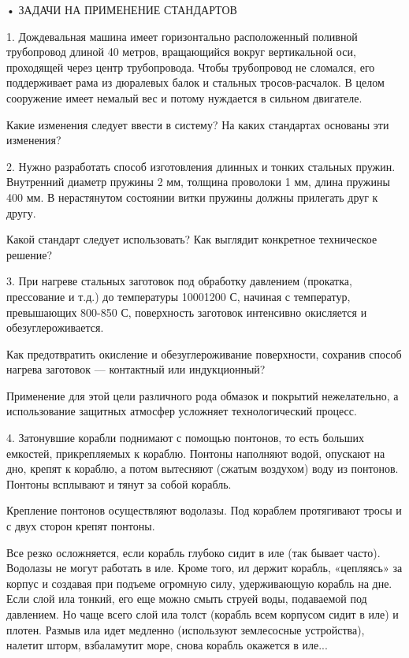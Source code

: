 • ЗАДАЧИ НА ПРИМЕНЕНИЕ СТАНДАРТОВ

1.  Дождевальная  машина  имеет горизонтально  расположенный  поливной
трубопровод  длиной 40  метров, вращающийся  вокруг вертикальной  оси,
проходящей через  центр трубопровода.  Чтобы трубопровод  не сломался,
его поддерживает рама из дюралевых балок и стальных тросов-расчалок. В
целом  сооружение  имеет немалый  вес  и  потому нуждается  в  сильном
двигателе.

Какие изменения следует ввести в систему? На каких стандартах основаны
эти изменения?

2.  Нужно разработать  способ изготовления  длинных и  тонких стальных
пружин.  Внутренний диаметр  пружины  2 мм,  толщина  проволоки 1  мм,
длина пружины  400 мм. В  нерастянутом состоянии витки  пружины должны
прилегать друг к другу.

Какой   стандарт  следует   использовать?   Как  выглядит   конкретное
техническое решение?

3. При  нагреве стальных заготовок под  обработку давлением (прокатка,
прессование и т.д.) до температуры  10001200 С, начиная с температур,
превышающих 800-850 С, поверхность  заготовок интенсивно окисляется и
обезуглероживается.

Как предотвратить окисление  и обезуглероживание поверхности, сохранив
способ нагрева заготовок — контактный или индукционный?

Применение  для   этой  цели   различного  рода  обмазок   и  покрытий
нежелательно,    а   использование    защитных   атмосфер    усложняет
технологический процесс.

4. Затонувшие  корабли поднимают с  помощью понтонов, то  есть больших
емкостей, прикрепляемых  к кораблю. Понтоны наполняют  водой, опускают
на дно, крепят к кораблю, а  потом вытесняют (сжатым воздухом) воду из
понтонов. Понтоны всплывают и тянут за собой корабль.


Крепление  понтонов осуществляют  водолазы.  Под кораблем  протягивают
тросы и с двух сторон крепят понтоны.

Все резко  осложняется, если корабль  глубоко сидит в иле  (так бывает
часто).  Водолазы не  могут  работать  в иле.  Кроме  того, ил  держит
корабль, «цепляясь»  за корпус и  создавая при подъеме  огромную силу,
удерживающую корабль на дне. Если слой ила тонкий, его еще можно смыть
струей воды,  подаваемой под давлением.  Но чаще всего слой  ила толст
(корабль всем корпусом сидит в иле) и плотен. Размыв ила идет медленно
(используют землесосные устройства),  налетит шторм, взбаламутит море,
снова корабль окажется в иле...

